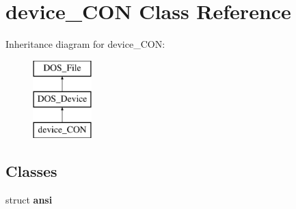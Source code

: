 \hypertarget{classdevice__CON}{\section{device\-\_\-\-C\-O\-N Class Reference}
\label{classdevice__CON}
}
Inheritance diagram for device\-\_\-\-C\-O\-N\-:\begin{figure}[H]
\begin{center}
\leavevmode
\includegraphics[height=3.000000cm]{classdevice__CON}
\end{center}
\end{figure}
\subsection*{Classes}
\begin{DoxyCompactItemize}
\item 
struct {\bfseries ansi}
\end{DoxyCompactItemize}
